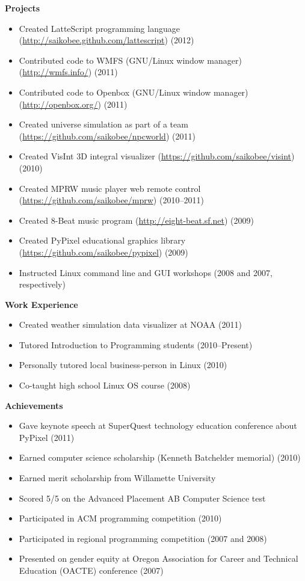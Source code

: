 \documentclass[10pt]{article}
\begin{document}
\medskip
\noindent \textbf{Projects} \hrulefill
\begin{itemize}
\item Created LatteScript programming language
    (\url{http://saikobee.github.com/lattescript}) (2012)
\item Contributed code to WMFS (GNU/Linux window manager)
    (\url{http://wmfs.info/}) (2011)
\item Contributed code to Openbox (GNU/Linux window manager)
    (\url{http://openbox.org/}) (2011)
\item Created universe simulation as part of a team
    (\url{https://github.com/saikobee/npcworld}) (2011)
\item Created VisInt 3D integral visualizer
    (\url{https://github.com/saikobee/visint}) (2010)
\item Created MPRW music player web remote control
    (\url{https://github.com/saikobee/mprw}) (2010\---2011)
\item Created 8-Beat music program
    (\url{http://eight-beat.sf.net}) (2009)
\item Created PyPixel educational graphics library
    (\url{https://github.com/saikobee/pypixel}) (2009)
\item Instructed Linux command line and GUI workshops (2008 and 2007, respectively)
\end{itemize}

\medskip
\noindent \textbf{Work Experience} \hrulefill
\begin{itemize}
\item Created weather simulation data visualizer at NOAA (2011)
\item Tutored Introduction to Programming students (2010\---Present)
\item Personally tutored local business-person in Linux (2010)
\item Co-taught high school Linux OS course (2008)
\end{itemize}

\medskip
\noindent \textbf{Achievements} \hrulefill
\begin{itemize}
\item Gave keynote speech at SuperQuest technology education conference about
PyPixel (2011)
\item Earned computer science scholarship (Kenneth Batchelder memorial) (2010)
\item Earned merit scholarship from Willamette University
\item Scored 5/5 on the Advanced Placement AB Computer Science test
\item Participated in ACM programming competition (2010)
\item Participated in regional programming competition (2007 and 2008)
\item Presented on gender equity at Oregon Association for Career and
Technical Education (OACTE) conference (2007)
\end{itemize}
\end{document}
